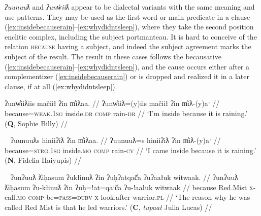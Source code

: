 \textit{ʔuunuuƛ} and \textit{ʔunw̓iiƛ} appear to be dialectal variants with the same meaning and use patterns. They may be used as the first word or main predicate in a clause (\ref{ex:insidebecauserain}--\ref{ex:whydidntsleep}), where they take the second position enclitic complex, including the subject portmanteau. It is hard to conceive of the relation {\textsc{because}} having a subject, and indeed the subject agreement marks the subject of the result. The result in these cases follows the becausative (\ref{ex:insidebecauserain}--\ref{ex:whydidntsleep}), and the cause occurs either after a complementizer (\ref{ex:insidebecauserain}) or is dropped and realized it in a later clause, if at all (\ref{ex:whydidntsleep}).

\begin{comment}
\ex \label{ex:uunuutl0}
\begingl
\glpreamble wiiksinḥimaḥ teʔiłšiƛ ʔuunuuƛ wałaakqas c̓uumuʕas. //
\gla wik-L.sinḥi=(m)aˑḥ teʔił-šiƛ ʔuunuuƛ wałaak=qaˑs c̓uumuʕas //
\glb \textsc{neg}-try.to.do=\textsc{real.1sg} sick.\textsc{dr}-\textsc{mo} because go.\textsc{dr}=\textsc{defn.1sg} Port.Alberni //
\glft `I’m trying not to get sick because I am going to Port Alberni.' (\textbf{B}, Bob Mundy) //
\endgl
\xe
\end{comment}


\ex \label{ex:insidebecauserain}
\begingl
\glpreamble ʔunw̓iiƛiis mačiił ʔin m̓iƛaa. //
\gla ʔunw̓iiƛ=(y)iis mačiił ʔin m̓iƛ-(y)aˑ //
\glb because=\textsc{weak.1sg} inside.\textsc{dr} \textsc{comp} rain-\textsc{dr} //
\glft `I'm inside because it is raining.' (\textbf{Q}, Sophie Billy) //
\endgl
\xe

\ex~ \label{ex:inisidebecauserain2}
\begingl
\glpreamble ʔuunuuƛs hiniiʔiƛ ʔin m̓iƛaa. //
\gla ʔuunuuƛ=s hiniiʔiƛ ʔin m̓iƛ-(y)aˑ //
\glb because=\textsc{strg.1sg} inside.\textsc{mo} \textsc{comp} rain-\textsc{cv} //
\glft `I came inside because it is raining.' (\textbf{N}, Fidelia Haiyupis) //
\endgl
\xe

\ex~ \label{ex:uunuutltlihasum}
\begingl
\glpreamble ʔunʔuuƛ ƛ̓iḥasum ʔukłinuƛ ʔin ʔuḥʔatqač̓a ʔuʔaałuk witwaak. //
\gla ʔunʔuuƛ ƛ̓iḥasum ʔu-kłinuƛ ʔin ʔuḥ=!at=qaˑč̓a ʔu-!aałuk witwaak //
\glb because Red.Mist \textsc{x}-call.\textsc{mo} \textsc{comp} be=\textsc{pass}=\textsc{dubv} \textsc{x}-look.after warrior.\textsc{pl} //
\glft `The reason why he was called Red Mist is that he led warriors.' (\textbf{C}, \textit{tupaat} Julia Lucas) //
\endgl
\xe

